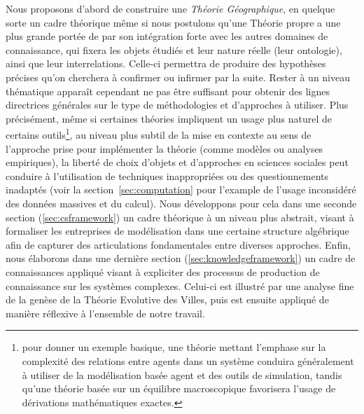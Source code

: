 {Nous proposons d'abord de construire une \emph{Théorie Géographique}, en quelque sorte un cadre théorique même si nous postulons qu'une Théorie propre a une plus grande portée de par son intégration forte avec les autres domaines de connaissance, qui fixera les objets étudiés et leur nature réelle (leur ontologie), ainsi que leur interrelations. Celle-ci permettra de produire des hypothèses précises qu'on cherchera à confirmer ou infirmer par la suite. Rester à un niveau thématique apparaît cependant ne pas être suffisant pour obtenir des lignes directrices générales sur le type de méthodologies et d'approches à utiliser. Plus précisément, même si certaines théories impliquent un usage plus naturel de certains outils\footnote{pour donner un exemple basique, une théorie mettant l'emphase sur la complexité des relations entre agents dans un système conduira généralement à utiliser de la modélisation basée agent et des outils de simulation, tandis qu'une théorie basée sur un équilibre macroscopique favorisera l'usage de dérivations mathématiques exactes.}, au niveau plus subtil de la mise en contexte au sens de l'approche prise pour implémenter la théorie (comme modèles ou analyses empiriques), la liberté de choix d'objets et d'approches en sciences sociales peut conduire à l'utilisation de techniques inappropriées ou des questionnements inadaptés (voir la section~\ref{sec:computation} pour l'example de l'usage inconsidéré des données massives et du calcul). Nous développons pour cela dans une seconde section (\ref{sec:csframework}) un cadre théorique à un niveau plus abstrait, visant à formaliser les entreprises de modélisation dans une certaine structure algébrique afin de capturer des articulations fondamentales entre diverses approches. Enfin, nous élaborons dans une dernière section (\ref{sec:knowledgeframework}) un cadre de connaissances appliqué visant à expliciter des processus de production de connaissance sur les systèmes complexes. Celui-ci est illustré par une analyse fine de la genèse de la Théorie Evolutive des Villes, puis est ensuite appliqué de manière réflexive à l'ensemble de notre travail.
}








